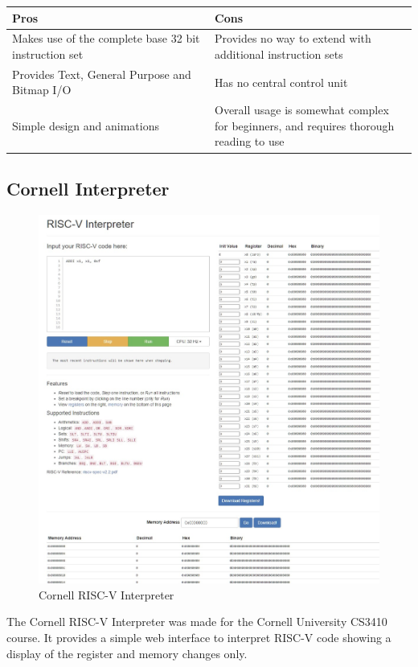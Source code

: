 \begin{table}[h]
\begin{tabular}{|p{0.5\linewidth} | p{0.5\linewidth}|}
\hline
\textbf{Pros}                                         & \textbf{Cons}                                                                         \\ \hline
Makes use of the complete base 32 bit instruction set & Provides no way to extend with additional instruction sets                            \\ \hline
Provides Text, General Purpose and Bitmap I/O         & Has no central control unit                                                           \\ \hline
Simple design and animations                          & Overall usage is somewhat complex for beginners, and requires thorough reading to use \\ \hline
\end{tabular}
\end{table}

\subsection{Cornell Interpreter}
\begin{figure}[H]
    \centering
    \includegraphics[width=0.75\linewidth]{dissertation/DATA/CORNELL.jpg}
    \caption{Cornell RISC-V Interpreter}
    \label{fig:cornell}
\end{figure}

The Cornell RISC-V Interpreter \cite{cornelluniversity_riscv} was made for the Cornell University CS3410 course. It provides a simple web interface to interpret RISC-V code showing a display of the register and memory changes only.

